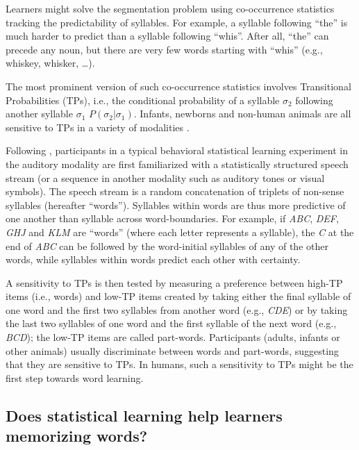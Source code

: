 \documentclass[
]{article}
\begin{document}
Learners might solve the segmentation problem using co-occurrence
statistics tracking the predictability of syllables. For example, a
syllable following ``the'' is much harder to predict than a syllable
following ``whis''. After all, ``the'' can precede any noun, but there
are very few words starting with ``whis'' (e.g., whiskey, whisker,
\ldots).

The most prominent version of such co-occurrence statistics involves
Transitional Probabilities (TPs), i.e., the conditional probability of a
syllable \(\sigma_2\) following another syllable \(\sigma_1\)
\(P(\sigma_2|\sigma_1)\). Infants, newborns and non-human animals are
all sensitive to TPs in a variety of modalities
\citep{Aslin1998, Chen2015, Creel2004, Endress-tone-tps, Endress-Action-Axc, Fiser2002a, Fiser2005, Flo2022, Glicksohn2011, Hauser2001, Kirkham2002, Saffran1996b, Saffran-Science, Saffran1999, Saffran2001, Sohail2016, Toro2005-backward, Turk-Browne2005, Turk-Browne-reversal}.

Following \citep{Aslin1998, Saffran-Science, Saffran1996b}, participants
in a typical behavioral statistical learning experiment in the auditory
modality are first familiarized with a statistically structured speech
stream (or a sequence in another modality such as auditory tones or
visual symbols). The speech stream is a random concatenation of triplets
of non-sense syllables (hereafter ``words''). Syllables within words are
thus more predictive of one another than syllable across
word-boundaries. For example, if \emph{ABC}, \emph{DEF}, \emph{GHJ} and
\emph{KLM} are ``words'' (where each letter represents a syllable), the
\emph{C} at the end of \emph{ABC} can be followed by the word-initial
syllables of any of the other words, while syllables within words
predict each other with certainty.

A sensitivity to TPs is then tested by measuring a preference between
high-TP items (i.e., words) and low-TP items created by taking either
the final syllable of one word and the first two syllables from another
word (e.g., \emph{CDE}) or by taking the last two syllables of one word
and the first syllable of the next word (e.g., \emph{BCD}); the low-TP
items are called part-words. Participants (adults, infants or other
animals) usually discriminate between words and part-words, suggesting
that they are sensitive to TPs. In humans, such a sensitivity to TPs
might be the first step towards word learning.

\hypertarget{does-statistical-learning-help-learners-memorizing-words}{%
\subsection{Does statistical learning help learners memorizing
words?}\label{does-statistical-learning-help-learners-memorizing-words}}
\end{document}
